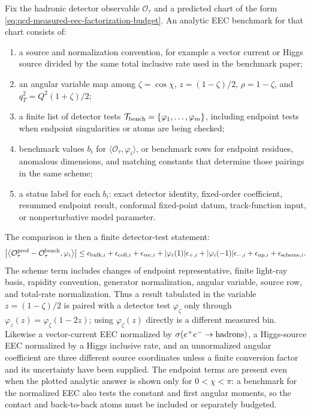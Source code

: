 \begin{controlledapproximation}
\label{ca:qcd-eec-analytic-benchmark-window}
Fix the hadronic detector observable \(\mathcal O_\tau\) and a predicted
chart of the form
\eqref{eq:qcd-measured-eec-factorization-budget}.  An analytic EEC benchmark
for that chart consists of:
\begin{enumerate}
  \item a source and normalization convention, for example a vector current
  or Higgs source divided by the same total inclusive rate used in the
  benchmark paper;
  \item an angular variable map among
  \(\zeta=\cos\chi\), \(z=(1-\zeta)/2\),
  \(\rho=1-\zeta\), and \(q_T^2=Q^2(1+\zeta)/2\);
  \item a finite list of detector tests
  \(\mathcal T_{\rm bench}=\{\varphi_1,\ldots,\varphi_m\}\), including
  endpoint tests when endpoint singularities or atoms are being checked;
  \item benchmark values \(b_i\) for
  \(\langle\mathcal O_\tau,\varphi_i\rangle\), or benchmark rows for
  endpoint residues, anomalous dimensions, and matching constants that
  determine those pairings in the same scheme;
  \item a status label for each \(b_i\): exact detector identity,
  fixed-order coefficient, resummed endpoint result, conformal fixed-point
  datum, track-function input, or nonperturbative model parameter.
\end{enumerate}
The comparison is then a finite detector-test statement:
\begin{equation}
  \left|
    \left\langle
      \mathcal O_{\tau}^{\rm pred}-\mathcal O_{\tau}^{\rm bench},
      \varphi_i
    \right\rangle
  \right|
  \leq
  \epsilon_{{\rm bulk},i}
  +\epsilon_{{\rm coll},i}
  +\epsilon_{{\rm rec},i}
  +|\varphi_i(1)|\epsilon_{+,i}
  +|\varphi_i(-1)|\epsilon_{-,i}
  +\epsilon_{{\rm np},i}
  +\epsilon_{{\rm scheme},i}.
  \label{eq:qcd-eec-analytic-benchmark-window-bound}
\end{equation}
The scheme term includes changes of endpoint representative, finite
light-ray basis, rapidity convention, generator normalization, angular
variable, source row, and total-rate normalization.  Thus a result tabulated in
the variable \(z=(1-\zeta)/2\) is paired with a detector test
\(\varphi_\zeta\) only through
\(\varphi_z(z)=\varphi_\zeta(1-2z)\); using \(\varphi_\zeta(z)\) directly is a
different measured bin.  Likewise a vector-current EEC normalized by
\(\sigma(e^+e^-\to{\rm hadrons})\), a Higgs-source EEC normalized by a Higgs
inclusive rate, and an unnormalized angular coefficient are three different
source coordinates unless a finite conversion factor and its uncertainty have
been supplied.  The endpoint terms are present even when the plotted analytic
answer is shown only for \(0<\chi<\pi\): a benchmark for the normalized EEC also
tests the constant and first angular moments, so the contact and back-to-back
atoms must be included or separately budgeted.


\end{controlledapproximation}
